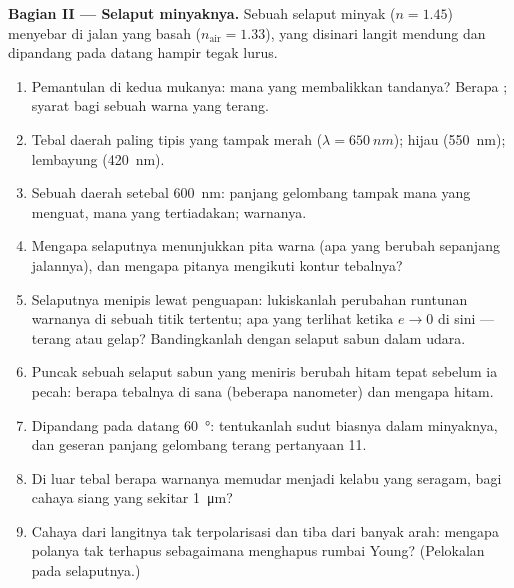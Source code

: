 \begin{problem}
\medskip
\noindent\textbf{Bagian II --- Selaput minyaknya.}
Sebuah selaput minyak ($n = 1.45$) menyebar di jalan yang basah ($n_{\text{air}} = 1.33$),
yang disinari langit mendung dan dipandang pada datang hampir tegak lurus.
\begin{enumerate}[resume]
  \item Pemantulan di kedua mukanya: mana yang membalikkan tandanya? Berapa ; syarat bagi sebuah warna yang terang.
  \item Tebal daerah paling tipis yang tampak merah ($\lambda =
        \qty{650}{nm}$); hijau (\qty{550}{nm}); lembayung (\qty{420}{nm}).
  \item Sebuah daerah setebal \qty{600}{nm}: panjang gelombang tampak mana yang
        menguat, mana yang tertiadakan; warnanya.
  \item Mengapa selaputnya menunjukkan pita warna (apa yang berubah sepanjang
        jalannya), dan mengapa pitanya mengikuti kontur tebalnya?
  \item Selaputnya menipis lewat penguapan: lukiskanlah perubahan runtunan
        warnanya di sebuah titik tertentu; apa yang terlihat ketika $e \to 0$
        di sini --- terang atau gelap? Bandingkanlah dengan selaput sabun dalam udara.
  \item Puncak sebuah selaput sabun yang meniris berubah hitam tepat sebelum ia
        pecah: berapa tebalnya di sana (beberapa nanometer) dan mengapa hitam.
  \item Dipandang pada datang \qty{60}{\degree}: tentukanlah sudut biasnya dalam minyaknya,
        dan geseran panjang gelombang terang pertanyaan 11.
  \item Di luar tebal berapa warnanya memudar menjadi kelabu yang
        seragam, bagi cahaya siang yang  sekitar \qty{1}{\micro m}?
  \item Cahaya dari langitnya tak terpolarisasi dan tiba dari banyak
        arah: mengapa polanya tak terhapus sebagaimana 
        menghapus rumbai Young? (Pelokalan pada selaputnya.)
\end{enumerate}


\end{problem}
